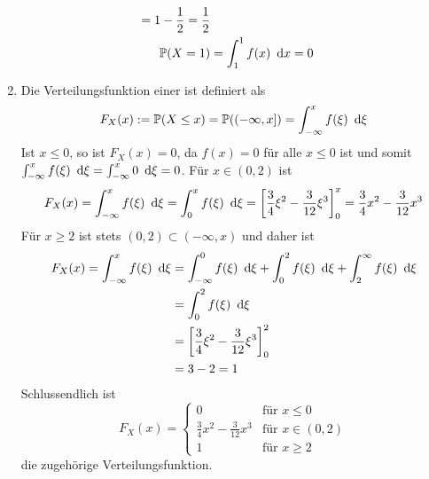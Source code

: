 \begin{exercisePage}
\begin{enumerate}[leftmargin=*, label=(\alph*)]
\begin{equation*}
\begin{aligned}
            = 1 - \frac{1}{2} = \frac{1}{2} \\
            \mathbb{P}(X=1) &= \int_1^1 f(x) \enskip \mathrm{d}x = 0              
            \end{aligned}
        \end{equation*}
        \item Die Verteilungsfunktion einer \ZV ist definiert als 
        \begin{equation*}
            F_X(x) \mathrel{:=} \mathbb{P}(X \leq x) = \mathbb{P}( (-\infty, x]) = \int_{-\infty}^x f(\xi) \enskip \mathrm{d}\xi
        \end{equation*}
        Ist $x \leq 0$, so ist $F_X(x) = 0$, da $f(x) = 0$ für alle $x \leq 0$ ist und somit $\int_{-\infty}^x f(\xi) \enskip \mathrm{d}\xi = \int_{-\infty}^x 0 \enskip \mathrm{d}\xi = 0$. Für $x \in (0,2)$ ist 
        \begin{equation*}
            F_X(x) = \int_{-\infty}^x f(\xi) \enskip \mathrm{d}\xi = \int_0^x f(\xi) \enskip \mathrm{d}\xi = \left[ \frac{3}{4} \xi^2 - \frac{3}{12} \xi^3 \right]_0^x = \frac{3}{4} x^2 - \frac{3}{12} x^3
        \end{equation*}
        Für $x \geq 2$ ist stets $(0,2) \subset (-\infty, x)$ und daher ist
        \begin{equation*}
            \begin{aligned}
            F_X(x) = \int_{-\infty}^x f(\xi) \enskip \mathrm{d}\xi 
            &= \int_{-\infty}^0 f(\xi) \enskip \mathrm{d}\xi + \int_0^2 f(\xi) \enskip \mathrm{d}\xi + \int_2^\infty f(\xi) \enskip \mathrm{d}\xi \\
            &= \int_0^2 f(\xi) \enskip \mathrm{d}\xi \\
            &= \left[ \frac{3}{4} \xi^2 - \frac{3}{12} \xi^3 \right]_0^2 \\
            &= 3-2 = 1
            \end{aligned}
        \end{equation*}
        Schlussendlich ist
        \begin{equation*}
            F_X(x) = \begin{cases}
            0 & \text{für } x \leq 0 \\
            \frac{3}{4} x^2 - \frac{3}{12} x^3 & \text{für } x \in (0,2) \\
            1 & \text{für } x \geq 2
            \end{cases}
        \end{equation*}   
        die zugehörige Verteilungsfunktion.     
    \end{enumerate}


\end{exercisePage}

